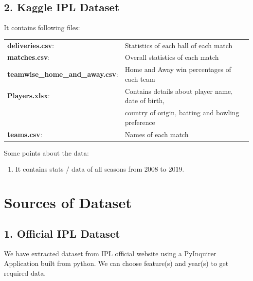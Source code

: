 \documentclass[12pt]{article}
\begin{document}
	\subsection*{2. Kaggle IPL Dataset}
	
	It contains following files:\\
	\begingroup
	\setlength{\tabcolsep}{6pt} %
	\renewcommand{\arraystretch}{1.3} %
	\begin{tabular}{ l l}
		\textbullet \textbf{deliveries.csv}: & Statistics of each ball of each match\\
		\textbullet \textbf{matches.csv}: & Overall statistics of each match\\
		\textbullet \textbf{teamwise\_home\_and\_away.csv}: & Home and Away win percentages of each team\\
		\textbullet \textbf{Players.xlsx}: & Contains details about player name, date of birth,\\ & country of origin, batting and bowling preference\\
		\textbullet \textbf{teams.csv}: & Names of each match\\
	\end{tabular}
	\newline\newline\newline
	Some points about the data:
	\begin{enumerate}
		\itemsep -0.2em 
		\item It contains stats / data of all seasons from 2008 to 2019.
	\end{enumerate}


\section*{Sources of Dataset}
	\subsection*{1. Official IPL Dataset}
	We have extracted dataset from IPL official website using a PyInquirer Application built from python. We can choose feature(s) and year(s) to get required data.
	
\end{document}
